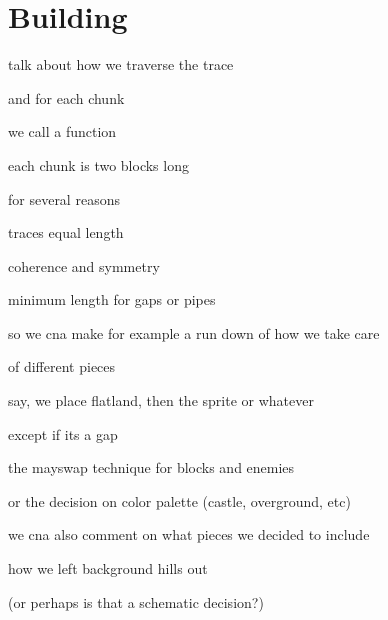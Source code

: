 \chapter{Building}

talk about how we traverse the trace

and for each chunk

we call a function

each chunk is two blocks long

for several reasons

traces equal length

coherence and symmetry

minimum length for gaps or pipes

so we cna make for example a run down of how we take care

of different pieces

say, we place flatland, then the sprite or whatever

except if its a gap

the mayswap technique for blocks and enemies

or the decision on color palette (castle, overground, etc)

we cna also comment on what pieces we decided to include

how we left background hills out

(or perhaps is that a schematic decision?)

